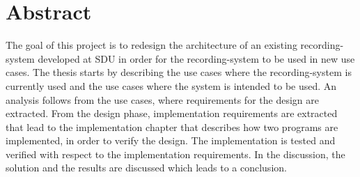 \chapter{Abstract}

The goal of this project is to redesign the architecture of an existing recording-system developed at SDU in order for the recording-system to be used in new use cases. The thesis starts by describing the use cases where the recording-system is currently used and the use cases where the system is intended to be used. An analysis follows from the use cases, where requirements for the design are extracted. From the design phase, implementation requirements are extracted that lead to the implementation chapter that describes how two programs are implemented, in order to verify the design. The implementation is tested and verified with respect to the implementation requirements. In the discussion, the solution and the results are discussed which leads to a conclusion.
